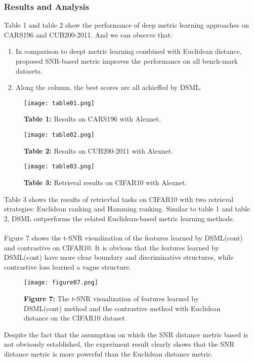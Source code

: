 \documentclass[12pt,paper=a4]{scrartcl}
\theoremstyle{break}
\begin{document}
\subsubsection{Results and Analysis}
Table 1 and table 2 show the performance of deep metric learning approaches on CARS196 and CUB200-2011. And we can observe that:
\begin{enumerate}
\item In comparison to deept metric learning combined with Euclidean distance, proposed SNR-based metric improves the performance on all bench-mark datasets.
\item Along the column, the best scores are all achieffed by DSML.
\end{enumerate}
\begin{figure}[h]
	\centering
  \texttt{[image: table01.png]}
  \caption{\textbf{Table 1:} Results on CARS196 with Alexnet.}
\end{figure}
\begin{figure}[h]
	\centering
  \texttt{[image: table02.png]}
  \caption{\textbf{Table 2:} Results on CUB200-2011 with Alexnet.}
\end{figure}
\begin{figure}[h]
	\centering
  \texttt{[image: table03.png]}
  \caption{\textbf{Table 3:} Retrieval results on CIFAR10 with Alexnet.}
\end{figure}
Table 3 shows the results of retrievbal tasks on CIFAR10 with two retrieval strategies: Euclidean ranking and Hamming ranking. Similar to table 1 and table 2, DSML outperforms the related Euclidean-based metric learning methods. \\ \\
Figure 7 shows the t-SNR visualization of the features learned by DSML(cont) and contrastive on CIFAR10. It is obvious that the features learned by DSML(cont) have more clear boundary and discriminative structures, while contrastive loss learned a vague structure.
\begin{figure}[h]
	\centering
  \texttt{[image: figure07.png]}
  \caption{\textbf{Figure 7:} The t-SNR visualization of features learned by DSML(cont) method and the contrastive method with Euclidean distance on the CIFAR10 dataset.}
\end{figure}
Despite the fact that the assumption on which the SNR distance metric based is not obviously established, the experiment result clearly shows that the SNR distance metric is more powerful than the Euclidean distance metric.
\end{document}

